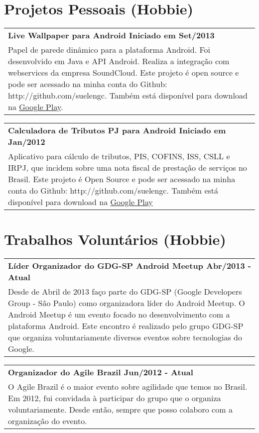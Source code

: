 \documentclass[a4paper, oneside, final]{scrartcl}
\newcommand{\vspc}{\vspace{0.15cm}} %
\begin{document}
\begin{center}
\section{Projetos Pessoais (Hobbie)}
\begin{tabularx}{1\linewidth}{X}
{\bf Live Wallpaper para Android \hfill Iniciado em Set/2013} \\
Papel de parede dinâmico para a plataforma Android. Foi desenvolvido em Java e API Android. Realiza a integração com webservices da empresa SoundCloud. Este projeto é open source e pode ser acessado na minha conta do Github: http://github.com/suelengc. Também está disponível para download na {\href{https://play.google.com/store/apps/details?id=br.com.suelengc.wallpaper}{Google Play}}. \vspc\\
\end{tabularx}

\begin{tabularx}{1\linewidth}{X}
{\bf Calculadora de Tributos PJ para Android \hfill Iniciado em Jan/2012} \\
Aplicativo para cálculo de tributos, PIS, COFINS, ISS, CSLL e IRPJ, que incidem sobre uma nota fiscal de prestação de serviços no Brasil. Este projeto é Open Source e pode ser acessado na minha conta do Github: http://github.com/suelengc. Também está disponível para download na {\href{https://play.google.com/store/apps/details?id=br.com.suelengc.calctributospj}{Google Play}} \vspc\\
\end{tabularx}

\section{Trabalhos Voluntários (Hobbie)}
\begin{tabularx}{1\linewidth}{X}
{\bf Líder Organizador do GDG-SP Android Meetup \hfill Abr/2013 - Atual} \\
Desde de Abril de 2013 faço parte do GDG-SP (Google Developers Group - São Paulo) como organizadora líder do Android Meetup. O Android Meetup é um evento focado no desenvolvimento com a plataforma Android. Este encontro é realizado pelo grupo GDG-SP que organiza voluntariamente diversos eventos sobre tecnologias do Google. \vspc\\
\end{tabularx}

\begin{tabularx}{1\linewidth}{X}
{\bf Organizador do Agile Brazil \hfill Jun/2012 - Atual} \\
O Agile Brazil é o maior evento sobre agilidade que temos no Brasil. Em 2012, fui convidada à participar do grupo que o organiza voluntariamente. Desde então, sempre que posso colaboro com a organização do evento. \vspc\\
\end{tabularx}


\end{center}
\end{document}
